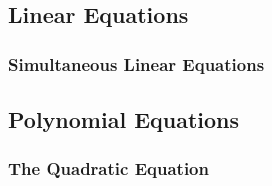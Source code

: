 









\subsection{Linear Equations}


\subsubsection{Simultaneous Linear Equations}






\subsection{Polynomial Equations}

\subsubsection{The Quadratic Equation}

